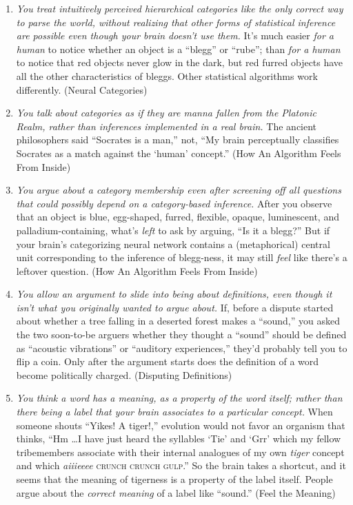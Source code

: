 \begin{enumerate}
\item {
 \textit{You treat intuitively perceived hierarchical categories
like the only correct way to parse the world, without realizing that
other forms of statistical inference are possible even though your
brain doesn't use them.} It's much
easier \textit{for a human} to notice whether an object is a
``blegg'' or
``rube''; than \textit{for a human}
to notice that red objects never glow in the dark, but red furred
objects have all the other characteristics of bleggs. Other statistical
algorithms work differently. (Neural Categories)}

\item {
 \textit{You talk about categories as if they are manna fallen from
the Platonic Realm, rather than inferences implemented in a real
brain.} The ancient philosophers said ``Socrates is a
man,'' not, ``My brain perceptually
classifies Socrates as a match against the
`human' concept.''
(How An Algorithm Feels From Inside)}

\item {
 \textit{You argue about a category membership even after screening
off all questions that could possibly depend on a category-based
inference.} After you observe that an object is blue, egg-shaped,
furred, flexible, opaque, luminescent, and palladium-containing,
what's \textit{left} to ask by arguing,
``Is it a blegg?'' But if your
brain's categorizing neural network contains a
(metaphorical) central unit corresponding to the inference of
blegg-ness, it may still \textit{feel} like there's a
leftover question. (How An Algorithm Feels From Inside)}

\item {
 \textit{You allow an argument to slide into being about
definitions, even though it isn't what you originally
wanted to argue about.} If, before a dispute started about whether a
tree falling in a deserted forest makes a
``sound,'' you asked the two
soon-to-be arguers whether they thought a
``sound'' should be defined as
``acoustic vibrations'' or
``auditory experiences,''
they'd probably tell you to flip a coin. Only after the
argument starts does the definition of a word become politically
charged. (Disputing Definitions)}

\item {
 \textit{You think a word has a meaning, as a property of the word
itself; rather than there being a label that your brain associates to a
particular concept.} When someone shouts ``Yikes! A
tiger!,'' evolution would not favor an organism that
thinks, ``Hm \ldots I have just heard the syllables
`Tie' and
`Grr' which my fellow tribemembers
associate with their internal analogues of my own \textit{tiger}
concept and which \textit{aiiieeee} \textsc{crunch crunch
gulp}.'' So the brain takes a shortcut, and it seems
that the meaning of tigerness is a property of the label itself. People
argue about the \textit{correct meaning} of a label like
``sound.'' (Feel the Meaning)}


\end{enumerate}
